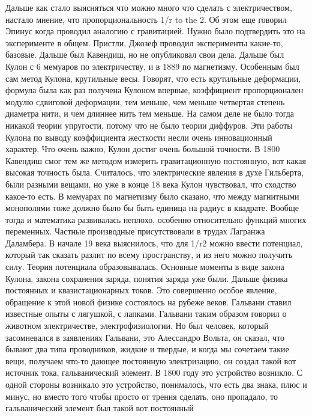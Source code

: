 \documentclass[a4paper, 12pt]{article}
\begin{document}
Дальше как стало выясняться что можно много что сделать 
с электричеством, настало мнение, что пропорциональность 1/r to the 2. 
Об этом еще говорил Эпинус когда проводил аналогию с гравитацией. Нужно 
было подтвердить это на эксперименте в общем. Пристли, Джозеф проводил 
эксперименты какие-то, базовые. Дальше был Кавендиш, но не опубликовал 
свои дела. Дальше был Кулон с 6 мемуаров по электричеству, и в 1889 по 
магнетизму. Особенным был сам метод Кулона, крутильные весы. Говорят, 
что есть крутильные деформации, формула была как раз получена Кулоном 
впервые, коэффициент пропорционален модулю сдвиговой деформации, тем 
меньше, чем меньше четвертая степень диаметра нити, и чем длиннее нить 
тем меньше. На самом деле не было тогда никакой теории упругости, потому 
что не было теории диффуров. Эти работы Кулона по выводу коэффициента 
жесткости несли очень инновационный характер. Что очень важно, Кулон 
достиг очень большой точности. В 1800 Кавендиш смог тем же методом 
измерить гравитационную постоянную, вот какая высокая точность была. 
Считалось, что электрические явления в духе Гильберта, были разными 
вещами, но уже в конце 18 века Кулон чувствовал, что сходство какое-то 
есть. В мемуарах по магнетизму было сказано, что между магнитными 
монополями тоже должно было бы быть единица на радиус в квадрате. Вообще 
тогда и математика развивалась неплохо, особенно относительно функций 
многих переменных. Частные производные присутствовали в трудах Лагранжа 
Даламбера. В начале 19 века выяснилось, что для 1/r2 можно ввести 
потенциал, который так сказать разлит по всему пространству, и из него 
можно получить силу. Теория потенциала образовывалась. Основные моменты 
в виде закона Кулона, закона сохранения заряда, понятия заряда уже были. 
Дальше физика постоянных и квазистационарных токов. Это совершенно 
особое явление, обращение к этой новой физике состоялось на рубеже 
веков. Гальвани ставил известные опыты с лягушкой, с лапками. Гальвани 
таким образом говорил о животном электричестве, электрофизиологии. Но 
был человек, который засомневался в заявлениях Гальвани, это Алессандро 
Вольта, он сказал, что бывают два типа проводников, жидкие и твердые, 
и когда мы сочетаем такие вещи, получаем что-то дающее постоянную 
электризацию, он создал такой вот источник тока, гальванический элемент. 
В 1800 году это устройство возникло. С одной стороны возникало это 
устройство, понималось, что есть два знака, плюс и минус, но вместо того 
чтобы просто от трения сделать, оно пропадало, то гальванический элемент 
был такой вот постоянный
\end{document}
